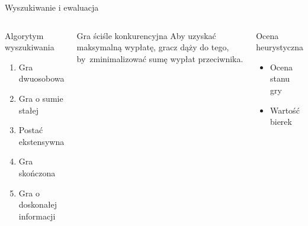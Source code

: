 \begin{frame}{Wyszukiwanie i ewaluacja}
    \begin{columns}
        \begin{block}{Algorytym wyszukiwania}
            \begin{enumerate}
                \item Gra dwuosobowa
                \item Gra o sumie stałej
                \item Postać ekstensywna
                \item Gra skończona
                \item Gra o doskonałej informacji
            \end{enumerate}

        \end{block}

        \begin{alertblock} {Gra ściśle konkurencyjna}
            Aby uzyskać maksymalną wypłatę, gracz dąży do tego, by~zminimalizować sumę wypłat
            przeciwnika.
        \end{alertblock}



        \begin{block}{Ocena heurystyczna}
            \begin{itemize}
                \item Ocena stanu gry
                \item Wartość bierek
            \end{itemize}
        \end{block}

    \end{columns}
\end{frame}